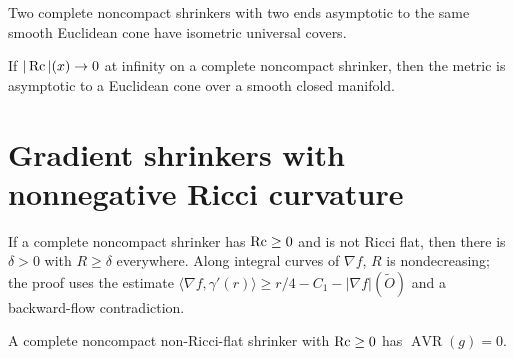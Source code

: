 \begin{theorem}
\label{thm:chow-iv-asymptotic-cone-uniqueness}

Two complete noncompact shrinkers with two ends asymptotic to the same smooth
Euclidean cone have isometric universal covers.
\end{theorem}

\begin{theorem}
\label{thm:chow-iv-asymptotic-cone}

If $|\operatorname{Rc}|(x)\to0$ at infinity on a complete noncompact shrinker, then the
metric is asymptotic to a Euclidean cone over a smooth closed manifold.
\end{theorem}

\section{Gradient shrinkers with nonnegative Ricci curvature}

\begin{theorem}
\label{thm:chow-iv-positive-scalar-shrinker}


If a complete noncompact shrinker has $\operatorname{Rc}\ge0$ and is not Ricci flat, then
there is $\delta>0$ with $R\ge\delta$ everywhere.  Along integral curves of
$\nabla f$, $R$ is nondecreasing; the proof uses the estimate
$\langle\nabla f,\gamma'(r)\rangle\ge r/4-C_1-|\nabla f|(\widetilde O)$
and a backward-flow contradiction.
\end{theorem}

\begin{theorem}
\label{thm:chow-iv-nonnegative-ricci-avr-zero}


A complete noncompact non-Ricci-flat shrinker with $\operatorname{Rc}\ge0$ has
$\operatorname{AVR}(g)=0$.
\end{theorem}

